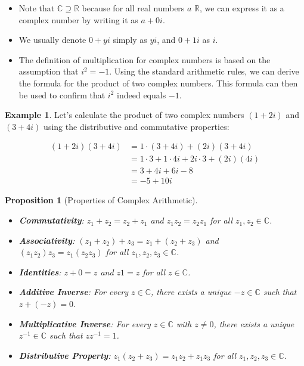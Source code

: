 \documentclass[
]{book}
\providecommand{\tightlist}{%
  \setlength{\itemsep}{0pt}\setlength{\parskip}{0pt}}
\newtheorem{proposition}{Proposition}[chapter]
\theoremstyle{definition}
\theoremstyle{definition}
\newtheorem{example}{Example}[chapter]
\theoremstyle{definition}
\theoremstyle{definition}
\theoremstyle{remark}
\begin{document}
\begin{itemize}
\tightlist
\item
  Note that \(\mathbb{C} \supseteq \mathbb{R}\) because for all real numbers \(a\) \(\mathbb{R}\), we can express it as a complex number by writing it as \(a + 0i\).
\item
  We usually denote \(0 + yi\) simply as \(yi\), and \(0 + 1i\) as \(i\).
\item
  The definition of multiplication for complex numbers is based on the assumption that \(i^2 = -1\). Using the standard arithmetic rules, we can derive the formula for the product of two complex numbers. This formula can then be used to confirm that \(i^2\) indeed equals \(-1\).
\end{itemize}

\begin{example}
\protect\hypertarget{exm:unnamed-chunk-2}{}\label{exm:unnamed-chunk-2}Let's calculate the product of two complex numbers \((1 + 2i)\) and \((3 + 4i)\) using the distributive and commutative properties:

\begin{align*}
(1 + 2i)(3 + 4i) &= 1 \cdot (3 + 4i) + (2i)(3 + 4i) \\
&= 1 \cdot 3 + 1 \cdot 4i + 2i \cdot 3 + (2i)(4i) \\
&= 3 + 4i + 6i - 8 \\
&= -5 + 10i
\end{align*}
\end{example}

\begin{proposition}[Properties of Complex Arithmetic]
\protect\hypertarget{prp:unnamed-chunk-3}{}\label{prp:unnamed-chunk-3}\leavevmode

\begin{itemize}
\tightlist
\item
  \textbf{Commutativity}: \(z_1 + z_2 = z_2 + z_1\) and \(z_1z_2 = z_2z_1\) for all \(z_1, z_2 \in \mathbb{C}\).
\item
  \textbf{Associativity}: \((z_1 + z_2) + z_3 = z_1 + (z_2 + z_3)\) and \((z_1z_2)z_3 = z_1(z_2z_3)\) for all \(z_1, z_2, z_3 \in \mathbb{C}\).
\item
  \textbf{Identities}: \(z + 0 = z\) and \(z1 = z\) for all \(z \in \mathbb{C}\).
\item
  \textbf{Additive Inverse}: For every \(z \in \mathbb{C}\), there exists a unique \(-z \in \mathbb{C}\) such that \(z + (-z) = 0\).
\item
  \textbf{Multiplicative Inverse}: For every \(z \in \mathbb{C}\) with \(z \neq 0\), there exists a unique \(z^{-1} \in \mathbb{C}\) such that \(zz^{-1} = 1\).
\item
  \textbf{Distributive Property}: \(z_1(z_2 + z_3) = z_1z_2 + z_1z_3\) for all \(z_1, z_2, z_3 \in \mathbb{C}\).
\end{itemize}

\end{proposition}
\end{document}
